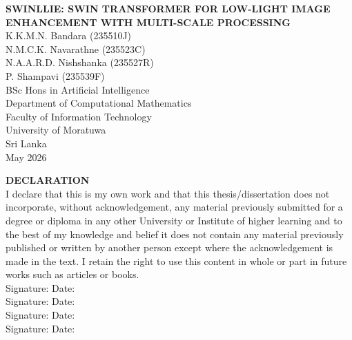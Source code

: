 \documentclass[12pt, a4paper]{report}
\begin{document}
\sloppy

\setcounter{page}{1}
\thispagestyle{plain}

\begin{center}
    \vspace*{1in}
    \textbf{\large SWINLLIE: SWIN TRANSFORMER FOR LOW-LIGHT IMAGE ENHANCEMENT WITH MULTI-SCALE PROCESSING}\\[1.5in]

    K.K.M.N. Bandara (235510J)\\[0.15in]
    N.M.C.K. Navarathne (235523C)\\[0.15in]
    N.A.A.R.D. Nishshanka (235527R)\\[0.15in]
    P. Shampavi (235539F)\\[1in]

    BSc Hons in Artificial Intelligence\\[1in]
    
    Department of Computational Mathematics\\
    Faculty of Information Technology\\[0.5in]
    
    University of Moratuwa\\
    Sri Lanka\\[1in]
    
    May 2026
\end{center}

\clearpage
{}
\vspace*{0.25in}
\noindent \textbf{DECLARATION}\\[0.2in]
I declare that this is my own work and that this thesis/dissertation does not incorporate, without acknowledgement, any material previously submitted for a degree or diploma in any other University or Institute of higher learning and to the best of my knowledge and belief it does not contain any material previously published or written by another person except where the acknowledgement is made in the text. I retain the right to use this content in whole or part in future works such as articles or books.\\[0.25in]

\noindent Signature: \makebox[2.7in]{\dotfill} \hspace{0.25in} Date: \makebox[1.4in]{\dotfill}\\[0.2in]
\noindent Signature: \makebox[2.7in]{\dotfill} \hspace{0.25in} Date: \makebox[1.4in]{\dotfill}\\[0.2in]
\noindent Signature: \makebox[2.7in]{\dotfill} \hspace{0.25in} Date: \makebox[1.4in]{\dotfill}\\[0.2in]
\noindent Signature: \makebox[2.7in]{\dotfill} \hspace{0.25in} Date: \makebox[1.4in]{\dotfill}\\[0.25in]
\end{document}
